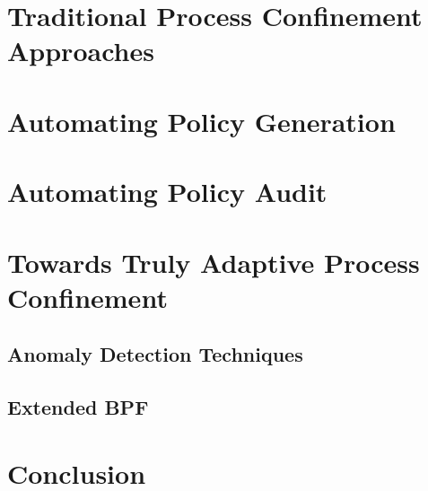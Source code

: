 \documentclass[dvipsnames, 12pt]{article}
\begin{document}
\section{Traditional Process Confinement Approaches}
\label{sec:traditional}

\section{Automating Policy Generation}
\label{sec:automating_generation}

\section{Automating Policy Audit}
\label{sec:automating_audit}

\section{Towards Truly Adaptive Process Confinement}
\label{sec:towards}

\subsection{Anomaly Detection Techniques}

\subsection{Extended BPF}

\section{Conclusion}
\label{sec:conclusion}


\nocite{*} %
\clearpage
\printbibliography
\end{document}
